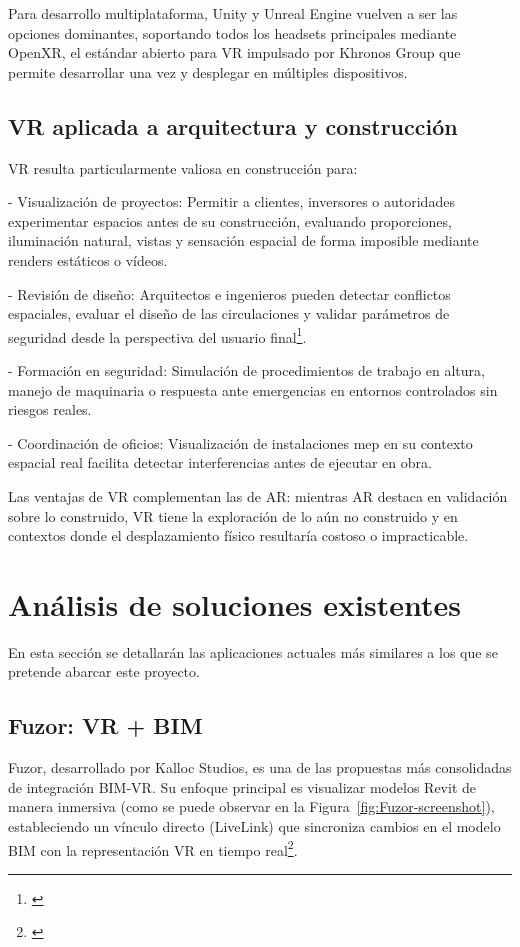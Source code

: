Para desarrollo multiplataforma, Unity y Unreal Engine vuelven a ser las opciones dominantes, soportando todos los headsets principales mediante OpenXR, el estándar abierto para VR impulsado por Khronos Group que permite desarrollar una vez y desplegar en múltiples dispositivos.

\subsection{VR aplicada a arquitectura y construcción}

VR resulta particularmente valiosa en construcción para:

- Visualización de proyectos: Permitir a clientes, inversores o autoridades experimentar espacios antes de su construcción, evaluando proporciones, iluminación natural, vistas y sensación espacial de forma imposible mediante renders estáticos o vídeos.

- Revisión de diseño: Arquitectos e ingenieros pueden detectar conflictos espaciales, evaluar el diseño de las circulaciones y validar parámetros de seguridad desde la perspectiva del usuario final\footnote{\cite{li2018critical}}.

- Formación en seguridad: Simulación de procedimientos de trabajo en altura, manejo de maquinaria o respuesta ante emergencias en entornos controlados sin riesgos reales.

- Coordinación de oficios: Visualización de instalaciones \gls{mep} en su contexto espacial real facilita detectar interferencias antes de ejecutar en obra.

Las ventajas de VR complementan las de AR: mientras AR destaca en validación sobre lo construido, VR tiene la exploración de lo aún no construido y en contextos donde el desplazamiento físico resultaría costoso o impracticable.

\section{Análisis de soluciones existentes}
En esta sección se detallarán las aplicaciones actuales más similares a los que se pretende abarcar este proyecto.
\subsection{Fuzor: VR + BIM}

Fuzor, desarrollado por Kalloc Studios, es una de las propuestas más consolidadas de integración BIM-VR. Su enfoque principal es visualizar modelos Revit de manera inmersiva (como se puede observar en la Figura~\ref{fig:Fuzor-screenshot}), estableciendo un vínculo directo (LiveLink) que sincroniza cambios en el modelo BIM con la representación VR en tiempo real\footnote{\cite{fuzor}}.

